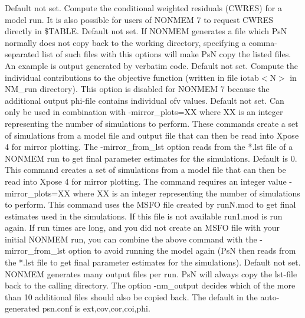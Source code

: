 \begin{optionlist}
Default not set. Compute the conditional weighted residuals (CWRES) for a model run. It is also possible for users of NONMEM 7 to request CWRES directly in \$TABLE. 
\nextopt
{}
Default not set. If NONMEM generates a file which PsN normally does not copy back to the working directory, specifying a comma-separated list of such files with this options will make PsN copy the listed files. An example is output generated by verbatim code. 
\nextopt
{}
Default not set. Compute the individual contributions to the objective function (written in file iotab$<$N$>$ in NM\_run  directory). This option is disabled for NONMEM 7 because the additional output phi-file contains individual ofv values. 
\nextopt
{}
Default not set. Can only be used in combination with -mirror\_plots=XX where XX is an integer representing the number of simulations to perform. These commands create a set of simulations from a model file and output file that can then be read into Xpose 4 for mirror plotting. The -mirror\_from\_lst option reads from the *.lst file of a NONMEM run to get final parameter estimates for the simulations. 
\nextopt
{}
Default is 0. This command creates a set of simulations from a model file that can then be read into Xpose 4 for mirror plotting. The command requires an integer value -mirror\_plots=XX where XX is an integer representing the number of simulations to perform. This command uses the MSFO file created by runN.mod to get final estimates used in the simulations. If this file is not available run1.mod is run again.  If run times are long, and you did not create an MSFO file with your initial NONMEM run, you can combine the above command with the -mirror\_from\_lst option to avoid running the model again (PsN then reads from the *.lst file to get final parameter estimates for the simulations). 
\nextopt
{}
Default not set. NONMEM generates many output files per run. PsN will always copy the lst-file back to the calling directory. The option -nm\_output decides which of the more than 10 additional files should also be copied back. The default in the auto-generated psn.conf is ext,cov,cor,coi,phi. 


\end{optionlist}
